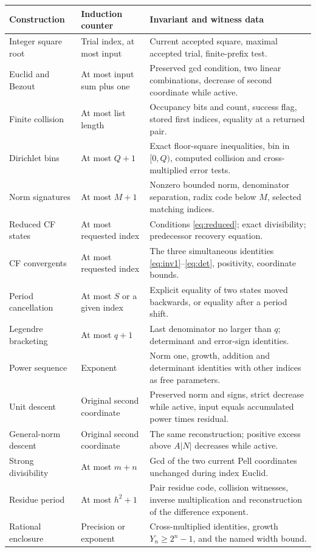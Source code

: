 \documentclass[11pt,letterpaper]{article}
\theoremstyle{definition}
\newcommand{\abs}[1]{\lvert#1\rvert}
\begin{document}
\begin{longtable}{p{}p{}p{}}
\toprule
Construction & Induction counter & Invariant and witness data\\
\midrule
\endhead
Integer square root & Trial index, at most input & Current accepted square,
maximal accepted trial, finite-prefix test.\\
Euclid and Bezout & At most input sum plus one & Preserved gcd condition,
two linear combinations, decrease of second coordinate while active.\\
Finite collision & At most list length & Occupancy bits and count, success
flag, stored first indices, equality at a returned pair.\\
Dirichlet bins & At most $Q+1$ & Exact floor-square inequalities, bin in
$[0,Q)$, computed collision and cross-multiplied error tests.\\
Norm signatures & At most $M+1$ & Nonzero bounded norm, denominator
separation, radix code below $M$, selected matching indices.\\
Reduced CF states & At most requested index & Conditions
\eqref{eq:reduced}; exact divisibility; predecessor recovery equation.\\
CF convergents & At most requested index & The three simultaneous
identities \eqref{eq:inv1}--\eqref{eq:det}, positivity, coordinate bounds.\\
Period cancellation & At most $S$ or a given index & Explicit equality of
two states moved backwards, or equality after a period shift.\\
Legendre bracketing & At most $q+1$ & Last denominator no larger than $q$;
determinant and error-sign identities.\\
Power sequence & Exponent & Norm one, growth, addition and determinant
identities with other indices as free parameters.\\
Unit descent & Original second coordinate & Preserved norm and signs,
strict decrease while active, input equals accumulated power times residual.\\
General-norm descent & Original second coordinate & The same reconstruction;
positive excess above $A\abs N$ decreases while active.\\
Strong divisibility & At most $m+n$ & Gcd of the two current Pell
coordinates unchanged during index Euclid.\\
Residue period & At most $h^2+1$ & Pair residue code, collision witnesses,
inverse multiplication and reconstruction of the difference exponent.\\
Rational enclosure & Precision or exponent & Cross-multiplied identities,
growth $Y_n\ge2^n-1$, and the named width bound.\\
\bottomrule
\end{longtable}
\end{document}

